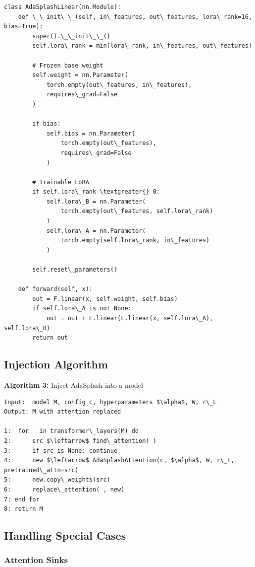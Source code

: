 \begin{lstlisting}
class AdaSplashLinear(nn.Module):
    def \_\_init\_\_(self, in\_features, out\_features, lora\_rank=16, bias=True):
        super().\_\_init\_\_()
        self.lora\_rank = min(lora\_rank, in\_features, out\_features)
        
        # Frozen base weight
        self.weight = nn.Parameter(
            torch.empty(out\_features, in\_features),
            requires\_grad=False
        )
        
        if bias:
            self.bias = nn.Parameter(
                torch.empty(out\_features),
                requires\_grad=False
            )
        
        # Trainable LoRA
        if self.lora\_rank \textgreater{} 0:
            self.lora\_B = nn.Parameter(
                torch.empty(out\_features, self.lora\_rank)
            )
            self.lora\_A = nn.Parameter(
                torch.empty(self.lora\_rank, in\_features)
            )
        
        self.reset\_parameters()
    
    def forward(self, x):
        out = F.linear(x, self.weight, self.bias)
        if self.lora\_A is not None:
            out = out + F.linear(F.linear(x, self.lora\_A), self.lora\_B)
        return out
\end{lstlisting}

\subsection{Injection Algorithm}

\textbf{Algorithm 3:} Inject AdaSplash into a model
\begin{lstlisting}
Input:  model M, config c, hyperparameters $\alpha$, W, r\_L
Output: M with attention replaced

1:  for   in transformer\_layers(M) do
2:      src $\leftarrow$ find\_attention( )
3:      if src is None: continue
4:      new $\leftarrow$ AdaSplashAttention(c, $\alpha$, W, r\_L, pretrained\_attn=src)
5:      new.copy\_weights(src)
6:      replace\_attention( , new)
7: end for
8: return M
\end{lstlisting}

\subsection{Handling Special Cases}

\subsubsection{Attention Sinks}

